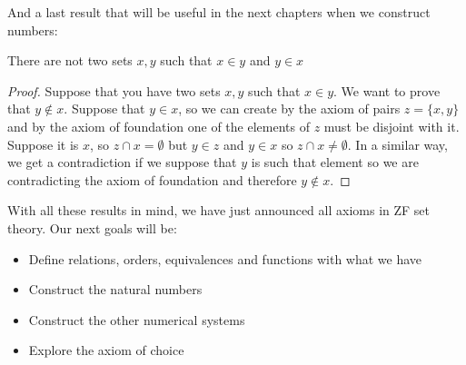 \documentclass{tufte-handout}
\begin{document}
And a last result that will be useful in the next chapters when we construct numbers:
\begin{theorem}
	There are not two sets $x, y$ such that $x \in y$ and $y \in x$
\end{theorem}
\begin{proof}
	Suppose that you have two sets $x, y$ such that $x \in y$. We want to prove that $y \not \in x$. Suppose that $y \in x$, so we can create by the axiom of pairs $z = \{x, y\}$ and by the axiom of foundation one of the elements of $z$ must be disjoint with it. Suppose it is $x$, so $z \cap x = \emptyset$ but $y \in z$ and $y \in x$ so $z \cap x \neq \emptyset$. In a similar way, we get a contradiction if we suppose that $y$ is such that element so we are contradicting the axiom of foundation and therefore $y \not\in x$.
\end{proof}

With all these results in mind, we have just announced all axioms in ZF set theory. Our next goals will be:
\begin{itemize}
	\item Define relations, orders, equivalences and functions with what we have
	\item Construct the natural numbers
	\item Construct the other numerical systems
	\item Explore the axiom of choice
\end{itemize}
\end{document}
